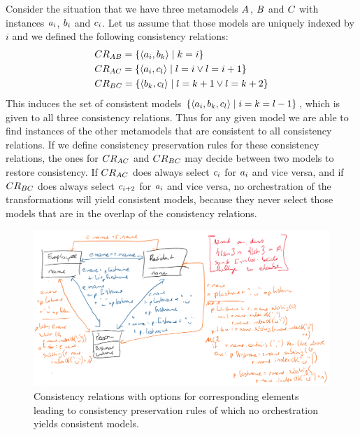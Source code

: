 Consider the situation that we have three metamodels $A_{}$, $B_{}$ and $C_{}$ with instances $a_{i}$, $b_{i}$ and $c_{i}$.
Let us assume that those models are uniquely indexed by $i$ and we defined the following consistency relations:
\begin{align*}
    &
    CR_{AB} = \{ \langle a_{i}, b_{k} \rangle \mid k = i \} \\
    &
    CR_{AC} = \{ \langle a_{i}, c_{l} \rangle \mid l = i \lor l = i+1 \} \\
    &
    CR_{BC} = \{ \langle b_{k}, c_{l} \rangle \mid l = k+1 \lor l = k+2 \}
\end{align*}
This induces the set of consistent models $\{ \langle a_{i}, b_{k}, c_{l} \rangle \mid  i = k = l-1 \}$, which is given to all three consistency relations.
Thus for any given model we are able to find instances of the other metamodels that are consistent to all consistency relations.
If we define consistency preservation rules for these consistency relations, the ones for $CR_{AC}$ and $CR_{BC}$ may decide between two models to restore consistency.
If $CR_{AC}$ does always select $c_{i}$ for $a_{i}$ and vice versa, and if $CR_{BC}$ does always select $c_{i+2}$ for $a_{i}$ and vice versa, no orchestration of the transformations will yield consistent models, because they never select those models that are in the overlap of the consistency relations.

\begin{figure}
    \centering
    \includegraphics[width=\textwidth]{figures/correctness/orchestration/no_orchestration.png}
    \caption[Consistency preservation rules without orchestration]{Consistency relations with options for corresponding elements leading to consistency preservation rules of which no orchestration yields consistent models.}
    \label{fig:orchestration:no_orchestration}
\end{figure}

